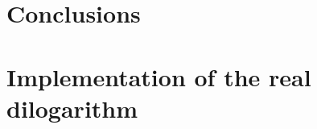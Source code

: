 \documentclass[10pt,DIV16,twocolumn]{scrartcl}
\begin{document}
\section{Conclusions}

\appendix

\section{Implementation of the real dilogarithm}






\end{document}
